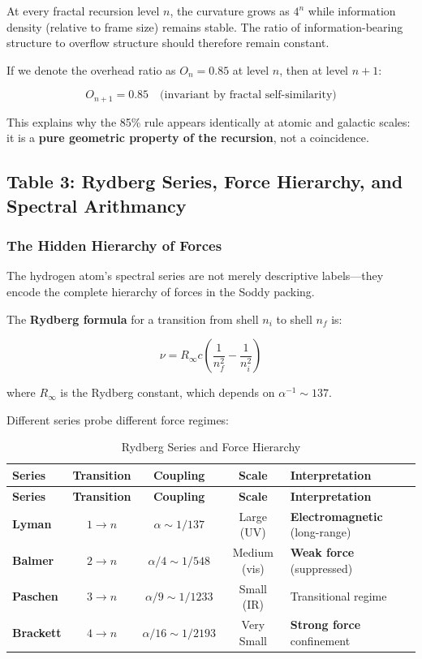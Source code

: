 \documentclass[11pt,a4paper]{article}
\begin{document}
At every fractal recursion level $n$, the curvature grows as $4^n$ while information density (relative to frame size) remains stable. The ratio of information-bearing structure to overflow structure should therefore remain constant.

If we denote the overhead ratio as $O_n = 0.85$ at level $n$, then at level $n+1$:

\begin{equation}
O_{n+1} = 0.85 \quad \text{(invariant by fractal self-similarity)}
\end{equation}

This explains why the 85\% rule appears identically at atomic and galactic scales: it is a \textbf{pure geometric property of the recursion}, not a coincidence.


\subsection{Table 3: Rydberg Series, Force Hierarchy, and Spectral Arithmancy}

\subsubsection{The Hidden Hierarchy of Forces}

The hydrogen atom's spectral series are not merely descriptive labels---they encode the complete hierarchy of forces in the Soddy packing.

The \textbf{Rydberg formula} for a transition from shell $n_i$ to shell $n_f$ is:

\begin{equation}
\nu = R_\infty c \left( \frac{1}{n_f^2} - \frac{1}{n_i^2} \right)
\end{equation}

where $R_\infty$ is the Rydberg constant, which depends on $\alpha^{-1} \sim 137$.

Different series probe different force regimes:

\begin{longtable}{|l|c|c|c|p{3.5cm}|}
\caption{Rydberg Series and Force Hierarchy} \\
\hline
\textbf{Series} & \textbf{Transition} & \textbf{Coupling} & \textbf{Scale} & \textbf{Interpretation} \\
\hline
\endfirsthead
\hline
\textbf{Series} & \textbf{Transition} & \textbf{Coupling} & \textbf{Scale} & \textbf{Interpretation} \\
\hline
\endhead
\hline
\endfoot
\hline
\endlastfoot
\textbf{Lyman} & $1 \to n$ & $\alpha \sim 1/137$ & Large (UV) & \textbf{Electromagnetic} (long-range) \\
\hline
\textbf{Balmer} & $2 \to n$ & $\alpha/4 \sim 1/548$ & Medium (vis) & \textbf{Weak force} (suppressed) \\
\hline
\textbf{Paschen} & $3 \to n$ & $\alpha/9 \sim 1/1233$ & Small (IR) & Transitional regime \\
\hline
\textbf{Brackett} & $4 \to n$ & $\alpha/16 \sim 1/2193$ & Very Small & \textbf{Strong force} confinement \\
\hline
\end{longtable}
\end{document}
